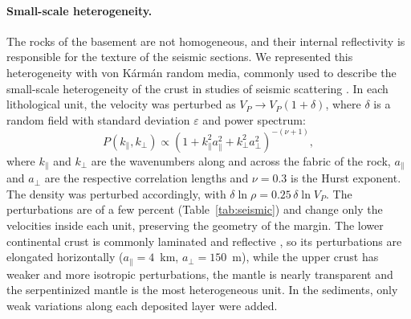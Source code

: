 \paragraph{Small-scale heterogeneity.}
The rocks of the basement are not homogeneous, and their internal reflectivity is responsible
for the texture of the seismic sections. We represented this heterogeneity with von
K\'arm\'an random media, commonly used to describe the small-scale heterogeneity of the crust
in studies of seismic scattering \citep{Frankel1986, Sato2012}. In each lithological unit, the
velocity was perturbed as $V_P \rightarrow V_P (1 + \delta)$, where $\delta$ is a random field
with standard deviation $\varepsilon$ and power spectrum:
\begin{equation}
  P(k_{\parallel}, k_{\perp}) \propto
  \left(1 + k_{\parallel}^2 a_{\parallel}^2 + k_{\perp}^2 a_{\perp}^2\right)^{-(\nu + 1)},
  \label{eq:von_karman}
\end{equation}
where $k_{\parallel}$ and $k_{\perp}$ are the wavenumbers along and across the fabric of the
rock, $a_{\parallel}$ and $a_{\perp}$ are the respective correlation lengths and $\nu = 0.3$
is the Hurst exponent. The density was perturbed accordingly, with
$\delta \ln \rho = 0.25\, \delta \ln V_P$. The perturbations are of a few percent
(Table~\ref{tab:seismic}) and change only the velocities inside each unit, preserving the
geometry of the margin. The lower continental crust is commonly laminated and reflective
\citep{Holliger1992}, so its perturbations are elongated horizontally ($a_{\parallel} = 4$~km,
$a_{\perp} = 150$~m), while the upper crust has weaker and more isotropic perturbations, the
mantle is nearly transparent and the serpentinized mantle is the most heterogeneous unit. In
the sediments, only weak variations along each deposited layer were added.

